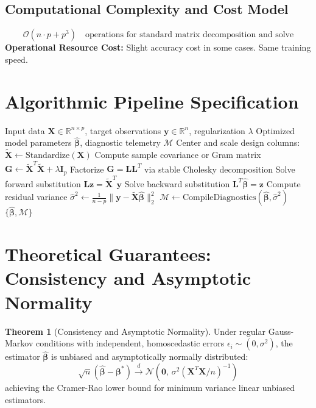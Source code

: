 \documentclass[11pt,a4paper]{article}
\theoremstyle{definition}
\newtheorem{theorem}{\textbf{Theorem}}[section]
\begin{document}
\subsection{Computational Complexity and Cost Model}
\begin{equation}
\mathcal{O}(n \cdot p + p^3) \quad \text{operations for standard matrix decomposition and solve}
\end{equation}
\textbf{Operational Resource Cost:} Slight accuracy cost in some cases. Same training speed.

\section{Algorithmic Pipeline Specification}

\begin{algorithm}[H]
\caption{Monotonic and interaction constraints for tree ensembles Execution}
\begin{algorithmic}[1]
\Require Input data $\mathbf{X} \in \mathbb{R}^{n \times p}$, target observations $\mathbf{y} \in \mathbb{R}^n$, regularization $\lambda$
\Ensure Optimized model parameters $\hat{\boldsymbol{\beta}}$, diagnostic telemetry $\mathcal{M}$
\State Center and scale design columns: $\tilde{\mathbf{X}} \gets \text{Standardize}(\mathbf{X})$
\State Compute sample covariance or Gram matrix $\mathbf{G} \gets \tilde{\mathbf{X}}^T \tilde{\mathbf{X}} + \lambda \mathbf{I}_p$
\State Factorize $\mathbf{G} = \mathbf{L} \mathbf{L}^T$ via stable Cholesky decomposition
\State Solve forward substitution $\mathbf{L} \mathbf{z} = \tilde{\mathbf{X}}^T \mathbf{y}$
\State Solve backward substitution $\mathbf{L}^T \hat{\boldsymbol{\beta}} = \mathbf{z}$
\State Compute residual variance $\hat{\sigma}^2 \gets \frac{1}{n - p} \| \mathbf{y} - \tilde{\mathbf{X}} \hat{\boldsymbol{\beta}} \|_2^2$
\State $\mathcal{M} \gets \text{CompileDiagnostics}(\hat{\boldsymbol{\beta}}, \hat{\sigma}^2)$
\State \Return $\{\hat{\boldsymbol{\beta}}, \mathcal{M}\}$
\end{algorithmic}
\end{algorithm}

\section{Theoretical Guarantees: Consistency and Asymptotic Normality}

\begin{theorem}[Consistency and Asymptotic Normality]
Under regular Gauss-Markov conditions with independent, homoscedastic errors $\epsilon_i \sim (0, \sigma^2)$, the estimator $\hat{\boldsymbol{\beta}}$ is unbiased and asymptotically normally distributed:
\begin{equation}
\sqrt{n}(\hat{\boldsymbol{\beta}} - \boldsymbol{\beta}^*) \xrightarrow{d} \mathcal{N}\left(\mathbf{0}, \, \sigma^2 (\mathbf{X}^T \mathbf{X} / n)^{-1}\right)
\end{equation}
achieving the Cramer-Rao lower bound for minimum variance linear unbiased estimators.
\end{theorem}
\end{document}

